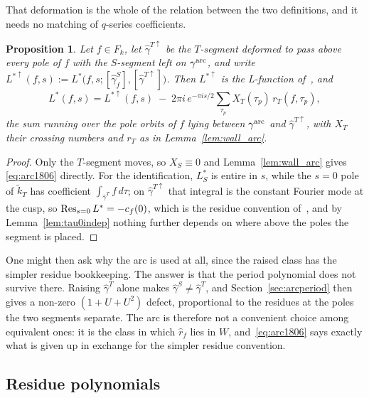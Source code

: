 \documentclass[11pt]{article}
\newtheorem{proposition}[theorem]{Proposition}
\newcommand{\tk}{\widetilde{k}_T}
\begin{document}
That deformation is the whole of the relation between the two definitions, and it needs no
matching of $q$-series coefficients.

\begin{proposition}\label{prop:arc1806}
Let $f\in F_k$, let $\hat\gamma^{T\uparrow}$ be the $T$-segment deformed to pass above every pole
of $f$ with the $S$-segment left on $\gamma^{\rm arc}$, and write
$L^{*\uparrow}(f,s):=L^*\big(f,s;[\hat\gamma^S_f],[\hat\gamma^{T\uparrow}]\big)$. Then
$L^{*\uparrow}$ is the L-function of~\cite{1806}, and
\begin{equation}\label{eq:arc1806}
L^*(f,s)=L^{*\uparrow}(f,s)\;-\;2\pi i\,e^{-\pi is/2}
\sum_{\tau_p}X_T(\tau_p)\,r_T(f,\tau_p),
\end{equation}
the sum running over the pole orbits of $f$ lying between $\gamma^{\rm arc}$ and
$\hat\gamma^{T\uparrow}$, with $X_T$ their crossing numbers and $r_T$ as in
Lemma~\ref{lem:wall_arc}.
\end{proposition}

\begin{proof}
Only the $T$-segment moves, so $X_S\equiv0$ and Lemma~\ref{lem:wall_arc} gives
\eqref{eq:arc1806} directly. For the identification, $L^*_S$ is entire in $s$, while the
$s=0$ pole of $\tk$ has coefficient $\int_{\hat\gamma^T}f\,d\tau$; on $\hat\gamma^{T\uparrow}$
that integral is the constant Fourier mode at the cusp, so
$\mathop{\rm Res}_{s=0}L^*=-c_f(0)$, which is the residue convention of~\cite{1806}, and by
Lemma~\ref{lem:tau0indep} nothing further depends on where above the poles the segment is placed.
\end{proof}


One might then ask why the arc is used at all, since the raised class has the simpler residue
bookkeeping. The answer is that the period polynomial does not survive there. Raising
$\hat\gamma^T$ alone makes $\hat\gamma^S\ne\hat\gamma^T$, and Section~\ref{sec:arcperiod} then gives
a non-zero $(1+U+U^2)$ defect, proportional to the residues at the poles the two segments separate.
The arc is therefore not a convenient choice among equivalent ones: it is the class in which
$\hat r_f$ lies in $W$, and~\eqref{eq:arc1806} says exactly what is given up in exchange for the
simpler residue convention.


\subsection{Residue polynomials}\label{sec:residue_polys}
\end{document}

